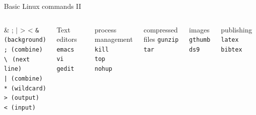 \documentclass{beamer}
\begin{document}
\begin{frame}{Basic Linux commands II}
  \begin{columns}
    \begin{block}{\& ; $|$ > <}
      \texttt{\& (background)} \\
      \texttt{; (combine)} \\
      \texttt{\textbackslash$\,$ (next line)} \\
      \texttt{| (combine)} \\
      \texttt{* (wildcard)} \\
      \texttt{> (output)} \\            
      \texttt{< (input)}
    \end{block}
    \begin{block}{Text editors}
      \texttt{emacs} \\
      \texttt{vi} \\
      \texttt{gedit}
    \end{block}

    \begin{block}{process management}
      \texttt{kill} \\
      \texttt{top} \\
      \texttt{nohup}
    \end{block}    
    \begin{block}{compressed files}
      \texttt{gunzip} \\
      \texttt{tar} 
    \end{block}
    \begin{block}{images}
      \texttt{gthumb} \\
      \texttt{ds9} 
    \end{block}    
    \begin{block}{publishing}
      \texttt{latex} \\
      \texttt{bibtex} 
    \end{block}
  \end{columns}
\end{frame}
\end{document}
